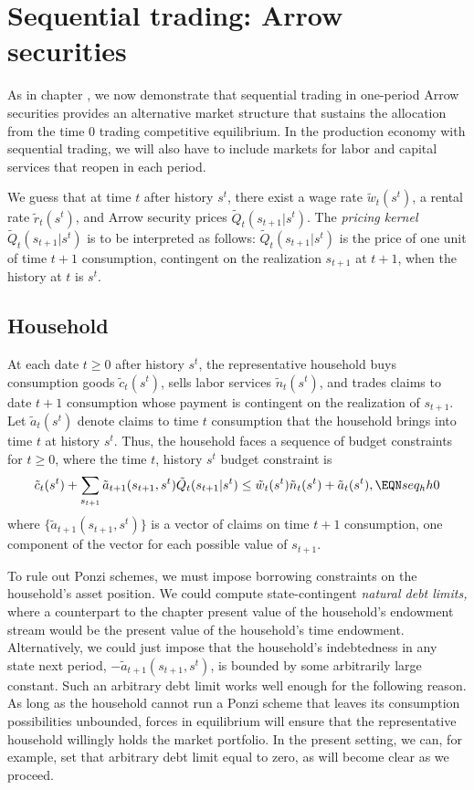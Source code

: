 \section{Sequential trading: Arrow securities}
As in chapter , we now demonstrate that sequential
trading in one-period Arrow securities provides an alternative
market structure that sustains the allocation from
the time $0$ trading competitive equilibrium.
In the production economy with sequential trading, we
will also have to include markets for labor and capital services
that reopen in each period.


We guess that at time $t$ after history $s^t$, there exist a
wage rate $\tilde w_t(s^t)$, a rental rate $\tilde r_t(s^t)$,
and Arrow security prices $\tilde Q_t(s_{t+1} | s^t)$.
The {\it pricing kernel} $\tilde Q_t(s_{t+1} | s^t)$ is to be
interpreted as follows:
$\tilde Q_t(s_{t+1} | s^t)$ is the price of one unit of
time $t+1$ consumption,
contingent on the realization $s_{t+1}$ at $t+1$, when the
history at $t$ is $s^t$.


\subsection{Household}
At each date $t \geq 0$ after history $s^t$,
the representative household buys consumption
goods $\tilde c_t(s^t)$, sells labor services $\tilde n_t(s^t)$, and
trades claims to date $t+1$ consumption
whose payment is  contingent
on the realization of $s_{t+1}$.   Let $\tilde a_t(s^t)$ denote 
claims to time $t$ consumption
that the household brings into time $t$ at history $s^t$. Thus,
the household faces a sequence of budget constraints
for $t \geq 0$, where the time $t$, history $s^t$ budget constraint is
$$ \tilde c_t(s^t) + \sum_{s_{t+1}} \tilde a_{t+1}(s_{t+1},s^t)
\tilde Q_t(s_{t+1} | s^t)
     \leq  \tilde w_t(s^t) \tilde n_t(s^t) + \tilde a_t(s^t) , \EQN seq_hh0   $$
 where
$\{\tilde a_{t+1}(s_{t+1},s^t)\}$  is a vector of claims on
time $t+1$ consumption,
one component of the vector for each  possible value of 
$s_{t+1}$.


To rule out Ponzi schemes, we must impose borrowing constraints on
the household's asset position. We could compute state-contingent
{\it natural debt limits,\/} where a counterpart to the chapter  present
value of the household's endowment stream would be the present
value of the household's time endowment. Alternatively, we could  just
impose that the household's indebtedness in any state
next period, $-\tilde a_{t+1}(s_{t+1},s^t)$, is bounded by some
arbitrarily large constant. Such an arbitrary debt limit works
well enough for the following reason. As long as the household cannot 
run a Ponzi scheme that leaves its consumption possibilities unbounded, 
 forces in equilibrium will ensure that the representative
household willingly holds the market portfolio. In the present setting, we
can, for example, set that arbitrary debt limit equal to zero, as will
become clear as we proceed.


